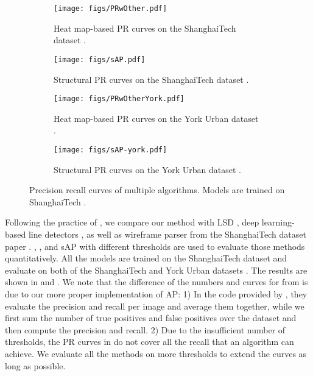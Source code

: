 \documentclass[10pt,twocolumn,letterpaper]{article}
\newcommand{\N}[1]{{\color{red}{#1}}}
\renewcommand{\N}[1]{{{#1}}}
\begin{document}
\begin{figure*}[t]
    \begin{subfigure}[b]{0.245\linewidth}
    \texttt{[image: figs/PRwOther.pdf]}
    \caption{Heat map-based PR curves on the ShanghaiTech dataset \cite{Huang:2018:LPW}.}\label{fig:result:ap}
    \end{subfigure}
    \begin{subfigure}[b]{0.245\linewidth}
    \texttt{[image: figs/sAP.pdf]}
    \caption{Structural PR curves on the ShanghaiTech dataset \cite{Huang:2018:LPW}.}\label{fig:result:sap}
    \end{subfigure}
    \begin{subfigure}[b]{0.245\linewidth}
    \texttt{[image: figs/PRwOtherYork.pdf]}
    \caption{Heat map-based PR curves on the York Urban dataset \cite{denis2008efficient}.}\label{fig:result:ap2}
    \end{subfigure}
    \begin{subfigure}[b]{0.245\linewidth}
    \texttt{[image: figs/sAP-york.pdf]}
    \caption{Structural PR curves on the York Urban dataset \cite{denis2008efficient}.}\label{fig:result:sap2}
    \end{subfigure}
    \caption{Precision recall curves of multiple algorithms.  Models are trained on ShanghaiTech .}\label{fig:result}
\end{figure*}

Following the practice of \cite{Huang:2018:LPW, xue2018learning}, we compare our method with LSD \cite{von2010lsd}, deep learning-based line detectors \cite{xue2018learning}, as well as wireframe parser from the ShanghaiTech dataset paper \cite{Huang:2018:LPW}. , , and sAP with different thresholds are used to evaluate those methods quantitatively.  \N{All the models are trained on the ShanghaiTech dataset and evaluate on both of the ShanghaiTech \cite{Huang:2018:LPW} and York Urban datasets \cite{denis2008efficient}. The results are shown in \Cref{tab:result} and \Cref{fig:result}.}  We note that the difference of the numbers and curves for  from \cite{Huang:2018:LPW, xue2018learning} is due to our more proper implementation of AP: 1) In the code provided by \cite{Huang:2018:LPW}, they evaluate the precision and recall per image and average them together, while we first sum the number of true positives and false positives over the dataset and then compute the precision and recall. 2) Due to the insufficient number of thresholds, the PR curves in \cite{Huang:2018:LPW, xue2018learning} do not cover all the recall that an algorithm can achieve. We evaluate all the methods on more thresholds to extend the curves as long as possible.
\end{document}
